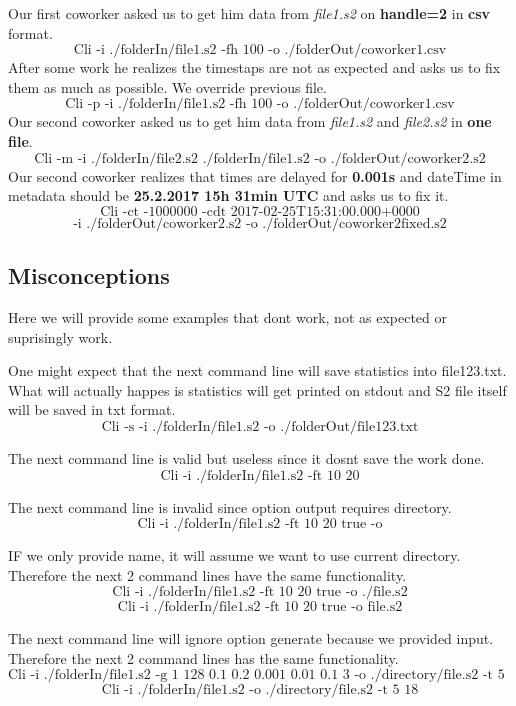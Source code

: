\documentclass[english]{article}
\begin{document}

Our first coworker asked us to get him data from \textit{file1.s2} on \textbf{handle=2} in \textbf{csv} format.
$$\text{Cli -i ./folderIn/file1.s2  -fh 100 -o ./folderOut/coworker1.csv}$$
After some work he realizes the timestaps are not as expected and asks us to fix them as much as possible. We override previous file.
$$\text{Cli -p -i ./folderIn/file1.s2 -fh 100 -o ./folderOut/coworker1.csv}$$
Our second coworker asked us to get him data from \textit{file1.s2} and \textit{file2.s2} in \textbf{one file}.
$$\text{Cli -m -i ./folderIn/file2.s2 ./folderIn/file1.s2 -o ./folderOut/coworker2.s2}$$
Our second coworker realizes that times are delayed for \textbf{0.001s} and dateTime in metadata should be \textbf{25.2.2017 15h 31min UTC} and asks us to fix it.
$$\text{Cli -ct -1000000 -cdt 2017-02-25T15:31:00.000+0000}$$ $$ \text{-i ./folderOut/coworker2.s2 -o ./folderOut/coworker2fixed.s2}$$



\subsection{Misconceptions}
Here we will provide some examples that dont work, not as expected or suprisingly work.

One might expect that the next command line will save statistics into file123.txt. What will actually happes is statistics will get printed on stdout and S2 file itself will be saved in txt format.
$$\text{Cli -s -i ./folderIn/file1.s2 -o ./folderOut/file123.txt}$$

The next command line is valid but useless since it dosnt save the work done.
$$\text{Cli -i ./folderIn/file1.s2 -ft 10 20}$$

The next command line is invalid since option output requires directory.
$$\text{Cli -i ./folderIn/file1.s2 -ft 10 20 true -o}$$

IF we only provide name, it will assume we want to use current directory. Therefore the next 2 command lines have the same functionality.
$$\text{Cli -i ./folderIn/file1.s2 -ft 10 20 true -o ./file.s2}$$
$$\text{Cli -i ./folderIn/file1.s2 -ft 10 20 true -o file.s2}$$

The next command line will ignore option generate because we provided input. Therefore the next 2 command lines has the same functionality.
$$\text{Cli -i ./folderIn/file1.s2 -g 1 128 0.1 0.2 0.001 0.01 0.1 3 -o ./directory/file.s2 -t 5 18}$$
$$\text{Cli -i ./folderIn/file1.s2 -o ./directory/file.s2 -t 5 18}$$
\end{document}
